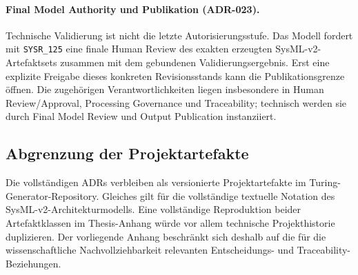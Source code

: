 \paragraph{Final Model Authority und Publikation (ADR-023).}
Technische Validierung ist nicht die letzte Autorisierungsstufe. Das Modell
fordert mit \texttt{SYSR\_125} eine finale Human Review des exakten erzeugten
SysML-v2-Artefaktsets zusammen mit dem gebundenen Validierungsergebnis. Erst
eine explizite Freigabe dieses konkreten Revisionsstands kann die
Publikationsgrenze öffnen. Die zugehörigen Verantwortlichkeiten liegen
insbesondere in Human Review/Approval, Processing Governance und
Traceability; technisch werden sie durch Final Model Review und
Output Publication instanziiert.

\subsection{Abgrenzung der Projektartefakte}
\label{app:adr_artifact_boundary}

Die vollständigen ADRs verbleiben als versionierte Projektartefakte im
Turing-Generator-Repository. Gleiches gilt für die vollständige textuelle
Notation des SysML-v2-Architekturmodells. Eine vollständige Reproduktion beider
Artefaktklassen im Thesis-Anhang würde vor allem technische Projekthistorie
duplizieren. Der vorliegende Anhang beschränkt sich deshalb auf die für die
wissenschaftliche Nachvollziehbarkeit relevanten Entscheidungs- und
Traceability-Beziehungen.
